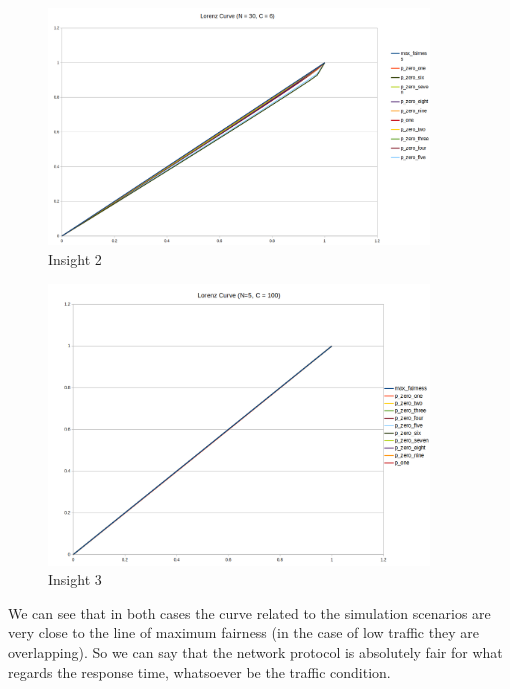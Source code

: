 \begin{figure}[H]
	\centering
	\includegraphics[width=0.9\textwidth]{img/LorenzHighTraffic.png}
	\caption{Insight 2}
	\label{img: insight2_respTime}
\end{figure}
\begin{figure}[H]
	\centering
	\includegraphics[width=0.9\textwidth]{img/LorenzLowTraffic.png}
	\caption{Insight 3}
	\label{img: insight3_respTime}
\end{figure}

\noindent We can see that in both cases the curve related to the simulation scenarios are very close to the line of maximum fairness (in the case of low traffic they are overlapping). So we can say that the network protocol is absolutely fair for what regards the response time, whatsoever be the traffic condition.


